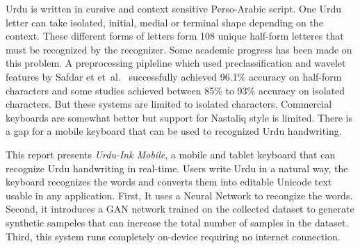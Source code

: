 \documentclass[12pt,a4paper]{report}
\begin{document}
Urdu is written in cursive and context sensitive Perso-Arabic script. One Urdu letter can take isolated, initial, medial or terminal shape depending on the context. These different forms of letters form 108 unique half-form letteres that must be recognized by the recognizer. Some academic progress has been made on this problem. A preprocessing pipleline which used preclassification and wavelet features by Safdar et et~al.\ \cite{safdar2022} successfully achieved 96.1\% accuracy on half-form characters and some studies achieved between 85\% to 93\% accuracy on isolated characters\cite{razzak2010,hussain,malik,shahzad}. But these systems are limited to isolated characters. Commercial keyboards are somewhat better but support for Nastaliq style is limited. There is a gap for a mobile keyboard that can be used to recognized Urdu handwriting.

This report presents \emph{Urdu-Ink Mobile}, a mobile and tablet keyboard that can recognize Urdu handwriting in real-time. Users write Urdu in a natural way, the keyboard recognizes the words and converts them into editable Unicode text usable in any application. First, It uses a Neural Network to recongize the words. Second, it introduces a GAN network \cite{zhu2017}trained on the collected dataset to generate synthetic sampeles that can increase the total number of samples in the dataset. Third, this system runs completely on-device requiring no internet connection.
\end{document}
